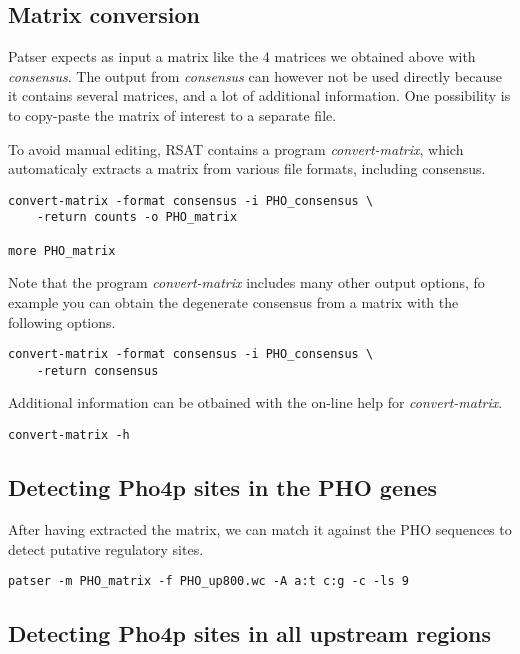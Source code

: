 \subsection{Matrix conversion}

Patser expects as input a matrix like the 4 matrices we obtained above
with \textit{consensus}. The output from \textit{consensus} can however
not be used directly because it contains several matrices, and a lot
of additional information. One possibility is to copy-paste the matrix
of interest to a separate file.

To avoid manual editing, RSAT contains a program
\textit{convert-matrix}, which automaticaly extracts a matrix from
various file formats, including consensus.

\begin{verbatim}
convert-matrix -format consensus -i PHO_consensus \
    -return counts -o PHO_matrix 

more PHO_matrix
\end{verbatim}

Note that the program \textit{convert-matrix} includes many other
output options, fo example you can obtain the degenerate consensus
from a matrix with the following options.

\begin{verbatim}
convert-matrix -format consensus -i PHO_consensus \
    -return consensus
\end{verbatim}

Additional information can be otbained with the on-line help for
\textit{convert-matrix}.

\begin{verbatim}
convert-matrix -h
\end{verbatim}

\subsection{Detecting Pho4p sites in the PHO genes}

After having extracted the matrix, we can match it against the PHO
sequences to detect putative regulatory sites.

\begin{verbatim}
patser -m PHO_matrix -f PHO_up800.wc -A a:t c:g -c -ls 9
\end{verbatim}

\subsection{Detecting Pho4p sites in all upstream regions}

